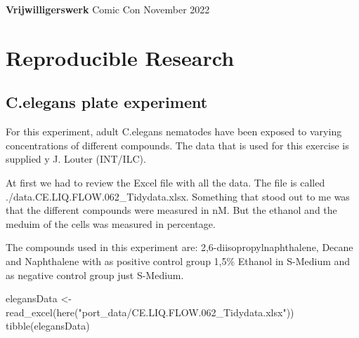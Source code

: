 \documentclass[
]{book}
\newenvironment{Shaded}{\begin{snugshade}}{\end{snugshade}}
\newcommand{\FunctionTok}[1]{\textcolor[rgb]{0.00,0.00,0.00}{#1}}
\newcommand{\NormalTok}[1]{#1}
\newcommand{\OtherTok}[1]{\textcolor[rgb]{0.56,0.35,0.01}{#1}}
\newcommand{\StringTok}[1]{\textcolor[rgb]{0.31,0.60,0.02}{#1}}
\begin{document}
\textbf{Vrijwilligerswerk}
Comic Con November 2022

\hypertarget{reproducible-research}{%
\chapter{Reproducible Research}\label{reproducible-research}}

\hypertarget{c.elegans-plate-experiment}{%
\section{C.elegans plate experiment}\label{c.elegans-plate-experiment}}

For this experiment, adult C.elegans nematodes have been exposed to varying concentrations of different compounds.
The data that is used for this exercise is supplied y J. Louter (INT/ILC).

At first we had to review the Excel file with all the data. The file is called ./data.CE.LIQ.FLOW.062\_Tidydata.xlsx.
Something that stood out to me was that the different compounds were measured in nM. But the ethanol and the meduim of the cells was measured in percentage.

The compounds used in this experiment are: 2,6-diisopropylnaphthalene, Decane and Naphthalene with as positive control group 1,5\% Ethanol in S-Medium and as negative control group just S-Medium.

\begin{Shaded}
\begin{Highlighting}[]
\NormalTok{elegansData }\OtherTok{\textless{}{-}} \FunctionTok{read\_excel}\NormalTok{(}\FunctionTok{here}\NormalTok{(}\StringTok{"port\_data/CE.LIQ.FLOW.062\_Tidydata.xlsx"}\NormalTok{))}
\FunctionTok{tibble}\NormalTok{(elegansData)}
\end{Highlighting}
\end{Shaded}
\end{document}
